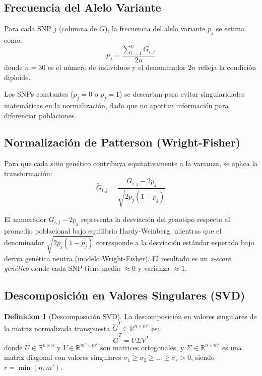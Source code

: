 \documentclass[12pt,a4paper]{article}
\theoremstyle{definition}
\newtheorem{definition}{Definicion}[section]
\newcommand{\R}{\mathbb{R}}
\begin{document}
\subsection{Frecuencia del Alelo Variante}

Para cada SNP $j$ (columna de $G$), la frecuencia del alelo variante $p_j$ se estima como:
\begin{equation}\label{eq:freq}
p_j = \frac{\sum_{i=1}^{n} G_{i,j}}{2n}
\end{equation}
donde $n = 30$ es el n\'{u}mero de individuos y el denominador $2n$ refleja la condici\'{o}n diploide.

Los SNPs constantes ($p_j = 0$ o $p_j = 1$) se descartan para evitar singularidades matem\'{a}ticas en la normalizaci\'{o}n, dado que no aportan informaci\'{o}n para diferenciar poblaciones.

\subsection{Normalizaci\'{o}n de Patterson (Wright-Fisher)}

Para que cada sitio gen\'{e}tico contribuya equitativamente a la varianza, se aplica la transformaci\'{o}n:
\begin{equation}\label{eq:patterson}
\tilde{G}_{i,j} = \frac{G_{i,j} - 2p_j}{\sqrt{2p_j(1-p_j)}}
\end{equation}

El numerador $G_{i,j} - 2p_j$ representa la desviaci\'{o}n del genotipo respecto al promedio poblacional bajo equilibrio Hardy-Weinberg, mientras que el denominador $\sqrt{2p_j(1-p_j)}$ corresponde a la desviaci\'{o}n est\'{a}ndar esperada bajo deriva gen\'{e}tica neutra (modelo Wright-Fisher). El resultado es un \emph{z-score gen\'{e}tico} donde cada SNP tiene media $\approx 0$ y varianza $\approx 1$.

\subsection{Descomposici\'{o}n en Valores Singulares (SVD)}

\begin{definition}[Descomposici\'{o}n SVD]
La descomposici\'{o}n en valores singulares de la matriz normalizada transpuesta $\tilde{G}^T \in \R^{n \times m'}$ es:
\begin{equation}\label{eq:svd}
\tilde{G}^T = U \Sigma V^T
\end{equation}
donde $U \in \R^{n \times n}$ y $V \in \R^{m' \times m'}$ son matrices ortogonales, y $\Sigma \in \R^{n \times m'}$ es una matriz diagonal con valores singulares $\sigma_1 \geq \sigma_2 \geq \dots \geq \sigma_r > 0$, siendo $r = \min(n, m')$.
\end{definition}
\end{document}
